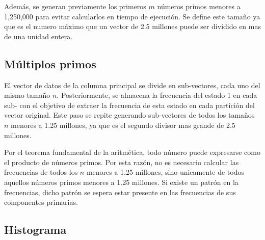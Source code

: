 \documentclass[12pt,twoside]{article}
\begin{document}
	Además, se generan previamente los primeros $m$ números primos menores a 1,250,000 para evitar calcularlos en tiempo de ejecución. Se define este tamaño ya que es el numero máximo que un vector de 2.5 millones puede ser dividido en mas de una unidad entera.
	
	\subsection{Múltiplos primos}
	
	El vector de datos de la columna principal se divide en sub-vectores, cada uno del mismo tamaño $n$. Posteriormente, se almacena la frecuencia del estado 1 en cada sub- con el objetivo de extraer la frecuencia de esta estado en cada partición del vector original. Este paso se repite generando sub-vectores de todos los tamaños $n$ menores a 1.25 millones, ya que es el segundo divisor mas grande de 2.5 millones.
	
	Por el teorema fundamental de la aritmética, todo número puede expresarse como el producto de números primos. Por esta razón, no es necesario calcular las frecuencias de todos los $n$ menores a 1.25 millones, sino unicamente de todos aquellos números primos menores a 1.25 millones. Si existe un patrón en la frecuencias, dicho patrón se espera estar presente  en las frecuencias de sus componentes primarias.
	
	\subsection{Histograma}
	
	
	
\end{document}
